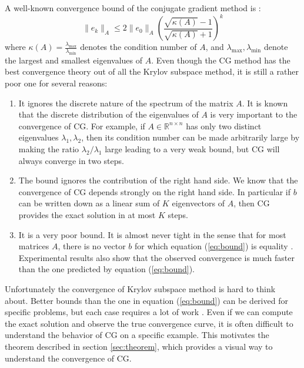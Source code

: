 \documentclass[10pt,a4paper]{article}
\begin{document}
A well-known convergence bound of the conjugate gradient method is \cite{liesen_strakoss_zdenek_2013}:
\begin{equation} \label{eq:bound}
\| e_k \|_A \leq 2 \| e_0 \|_A \left( \frac{\sqrt{\kappa(A)} -1 }{\sqrt{\kappa(A)}+1} \right)^k
 \end{equation}
where $\kappa(A) = \frac{\lambda_{\text{max}}}{\lambda_{\text{min}}}$ denotes the condition number of $A$, and $\lambda_{\text{max}}, \lambda_{\text{min}}$ denote the largest and smallest eigenvalues of $A$. Even though the CG method has the best convergence theory out of all the Krylov subspace method, it is still a rather poor one for several reasons:
\begin{enumerate}
\item It ignores the discrete nature of the spectrum of the matrix $A$. It is known that the discrete distribution of the eigenvalues of $A$ is very important to the convergence of CG.  For example, if $A \in \mathbb{R}^{n \times n}$ has only two distinct eigenvalues $\lambda_1, \lambda_2$, then its condition number can be made arbitrarily large by making the ratio $ \lambda_2 / \lambda_1$ large leading to a very weak bound, but CG will always converge in two steps.
\item The bound ignores the contribution of the right hand side. We know that the convergence of CG depends strongly on the right hand side. In particular if $b$ can be written down as a linear sum of $K$ eigenvectors of $A$, then CG provides the exact solution in at most $K$ steps.
\item It is a very poor bound. It is almost never tight in the sense that for most matrices $A$, there is no vector $b$ for which equation (\ref{eq:bound}) is equality \cite{liesen_strakoss_zdenek_2013}. Experimental results also show that the observed convergence is much faster than the one predicted by equation (\ref{eq:bound}).
\end{enumerate}

Unfortunately the convergence of Krylov subspace method is hard to think about. Better bounds than the one in equation (\ref{eq:bound}) can be derived for specific problems, but each case requires a lot of work  \cite{beckermann2001superlinear,beckermann2002superlinear}. Even if we can compute the exact solution and observe the true convergence curve, it is often difficult to understand the behavior of CG on a specific example. This motivates the theorem described in section \ref{sec:theorem}, which provides a visual way to understand the convergence of CG.
\end{document}
